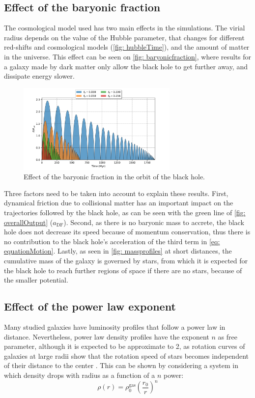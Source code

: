 	\subsection{Effect of the baryonic fraction}
	The cosmological model used has two main effects in the simulations. The virial radius depends on the value of the Hubble parameter, that changes for different red-shifts and cosmological models (\autoref{fig: hubbleTime}), and the amount of matter in the universe. This effect can be seen on \autoref{fig: baryonicfraction}, where results for a galaxy made by dark matter only allow the black hole to get further away, and dissipate energy slower.
	\begin{figure}[h]
		\centering
		\includegraphics[width = 0.7\textwidth]{"../Files/Week 5/baryonic_fraction_comparison"}
		\caption{Effect of the baryonic fraction in the orbit of the black hole.}
		\label{fig: baryonicfraction}
	\end{figure}

	Three factors need to be taken into account to explain these results. First, dynamical friction due to collisional matter has an important impact on the trajectories followed by the black hole, as can be seen with the green line of \autoref{fig: overallOutput} ($a_\text{DF}$). Second, as there is no baryonic mass to accrete, the black hole does not decrease its speed because of momentum conservation, thus there is no contribution to the black hole's acceleration of the third term in \autoref{eq: equationMotion}. Lastly, as seen in \autoref{fig: massprofiles} at short distances, the cumulative mass of the galaxy is governed by stars, from which it is expected for the black hole to reach further regions of space if there are no stars, because of the smaller potential.
		
	\subsection{Effect of the power law exponent}	
		Many studied galaxies have luminosity profiles that follow a power law in distance. Nevertheless, power law density profiles have the exponent $n$ as free parameter, although it is expected to be approximate to 2, as rotation curves of galaxies at large radii show that the rotation speed of stars becomes independent of their distance to the center \cite{binney2011galactic}. This can be shown by considering a system in which density drops with radius as a function of a $n$ power:
		\begin{equation}
			\rho(r) = \rho_0^\text{gas}\left(\dfrac{r_0}{r}\right)^n
		\end{equation}
		

